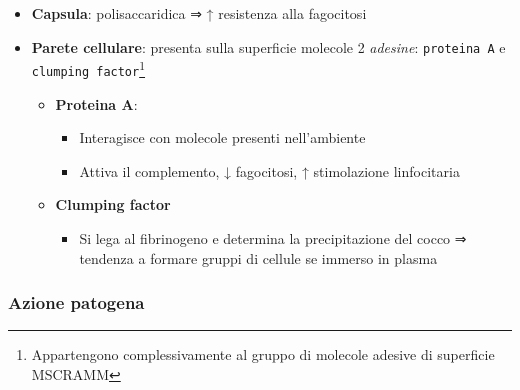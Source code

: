 \documentclass[italian,]{article}
\providecommand{\tightlist}{%
  \setlength{\itemsep}{0pt}\setlength{\parskip}{0pt}}
\begin{document}
\begin{itemize}
\tightlist
\item
  \textbf{Capsula}: polisaccaridica ⇒ ↑ resistenza alla fagocitosi
\item
  \textbf{Parete cellulare}: presenta sulla superficie molecole 2
  \emph{adesine}: \texttt{proteina\ A} e
  \texttt{clumping\ factor}\footnote{Appartengono complessivamente al
    gruppo di molecole adesive di superficie MSCRAMM}

  \begin{itemize}
  \tightlist
  \item
    \textbf{Proteina A}:

    \begin{itemize}
    \tightlist
    \item
      Interagisce con molecole presenti nell'ambiente
    \item
      Attiva il complemento, ↓ fagocitosi, ↑ stimolazione linfocitaria
    \end{itemize}
  \item
    \textbf{Clumping factor}

    \begin{itemize}
    \tightlist
    \item
      Si lega al fibrinogeno e determina la precipitazione del cocco ⇒
      tendenza a formare gruppi di cellule se immerso in plasma
    \end{itemize}
  \end{itemize}
\end{itemize}

\hypertarget{azione-patogena}{%
\subsubsection{Azione patogena}\label{azione-patogena}}
\end{document}
